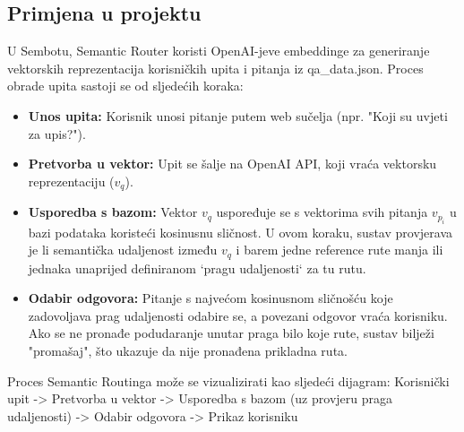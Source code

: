 \subsection{Primjena u projektu}
U Sembotu, Semantic Router koristi OpenAI-jeve embeddinge za generiranje vektorskih reprezentacija korisničkih upita i pitanja iz qa\_data.json. Proces obrade upita sastoji se od sljedećih koraka:
\begin{itemize}
\item \textbf{Unos upita:} Korisnik unosi pitanje putem web sučelja (npr. "Koji su uvjeti za upis?").
\item \textbf{Pretvorba u vektor:} Upit se šalje na OpenAI API, koji vraća vektorsku reprezentaciju ($v_q$).
\item \textbf{Usporedba s bazom:} Vektor $v_q$ uspoređuje se s vektorima svih pitanja $v_{p_i}$ u bazi podataka koristeći kosinusnu sličnost. U ovom koraku, sustav provjerava je li semantička udaljenost između $v_q$ i barem jedne reference rute manja ili jednaka unaprijed definiranom `pragu udaljenosti` za tu rutu.
\item \textbf{Odabir odgovora:} Pitanje s najvećom kosinusnom sličnošću koje zadovoljava prag udaljenosti odabire se, a povezani odgovor vraća korisniku. Ako se ne pronađe podudaranje unutar praga bilo koje rute, sustav bilježi "promašaj", što ukazuje da nije pronađena prikladna ruta.
\end{itemize}
Proces Semantic Routinga može se vizualizirati kao sljedeći dijagram:
Korisnički upit -> Pretvorba u vektor -> Usporedba s bazom (uz provjeru praga udaljenosti) -> Odabir odgovora -> Prikaz korisniku